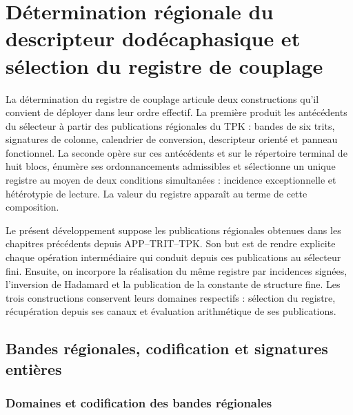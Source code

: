 \section{Détermination régionale du descripteur dodécaphasique et sélection du registre de couplage}
\label{chap:despliegue-selector-k}

La détermination du registre de couplage articule deux constructions qu'il convient de déployer dans leur ordre effectif. La première produit les antécédents du sélecteur à partir des publications régionales du TPK : bandes de six trits, signatures de colonne, calendrier de conversion, descripteur orienté et panneau fonctionnel. La seconde opère sur ces antécédents et sur le répertoire terminal de huit blocs, énumère ses ordonnancements admissibles et sélectionne un unique registre au moyen de deux conditions simultanées : incidence exceptionnelle et hétérotypie de lecture. La valeur du registre apparaît au terme de cette composition.

Le présent développement suppose les publications régionales obtenues
dans les chapitres précédents depuis APP--TRIT--TPK. Son but est de rendre
explicite chaque opération intermédiaire qui conduit depuis ces publications
au sélecteur fini. Ensuite, on incorpore la réalisation du même registre par incidences signées, l'inversion de Hadamard et la publication de la constante de structure fine. Les trois constructions
conservent leurs domaines respectifs : sélection du registre, récupération
depuis ses canaux et évaluation arithmétique de ses publications.

\subsection{Bandes régionales, codification et signatures entières}

\subsubsection{Domaines et codification des bandes régionales}

